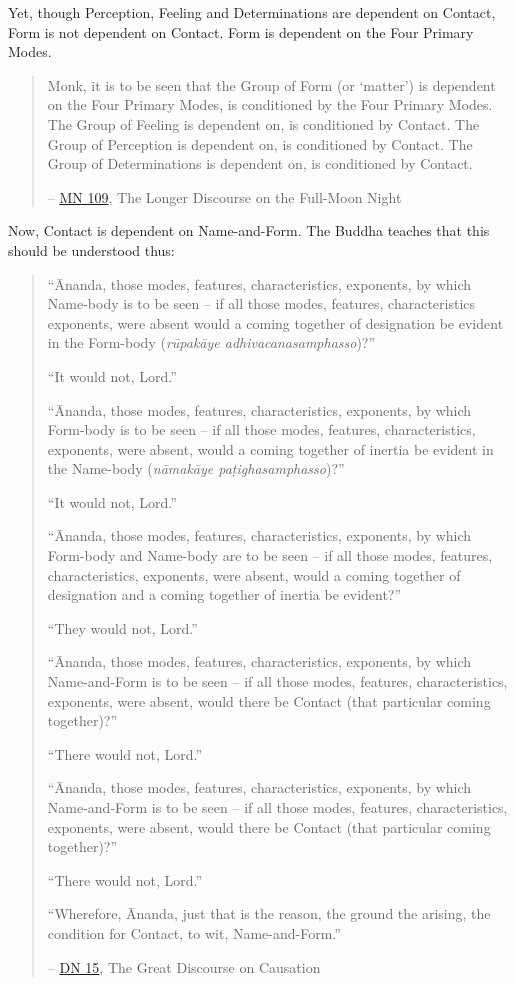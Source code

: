Yet, though Perception, Feeling and Determinations are dependent on Contact, Form is not dependent on Contact. Form is dependent on the Four Primary Modes.

\begin{quote}
\protect\hypertarget{dependent}{}{}Monk, it is to be seen that the Group of Form (or `matter') is dependent on the Four Primary Modes, is conditioned by the Four Primary Modes. The Group of Feeling is dependent on, is conditioned by Contact. The Group of Perception is dependent on, is conditioned by Contact. The Group of Determinations is dependent on, is conditioned by Contact.

 -- \href{https://suttacentral.net/mn109/en/sujato}{MN 109}, The Longer Discourse on the Full-Moon Night
\end{quote}

Now, Contact is dependent on Name-and-Form. The Buddha teaches that this should be understood thus:

\begin{quote}
``Ānanda, those modes, features, characteristics, exponents, by which Name-body is to be seen -- if all those modes, features, characteristics exponents, were absent would a coming together of designation be evident in the Form-body (\emph{rūpakāye adhivacanasamphasso})?''

``It would not, Lord.''

``Ānanda, those modes, features, characteristics, exponents, by which Form-body is to be seen -- if all those modes, features, characteristics, exponents, were absent, would a coming together of inertia be evident in the Name-body (\emph{nāmakāye paṭighasamphasso})?''

``It would not, Lord.''

``Ānanda, those modes, features, characteristics, exponents, by which Form-body and Name-body are to be seen -- if all those modes, features, characteristics, exponents, were absent, would a coming together of designation and a coming together of inertia be evident?''

``They would not, Lord.''

``Ānanda, those modes, features, characteristics, exponents, by which Name-and-Form is to be seen -- if all those modes, features, characteristics, exponents, were absent, would there be Contact (that particular coming together)?''

``There would not, Lord.''

``Ānanda, those modes, features, characteristics, exponents, by which Name-and-Form is to be seen -- if all those modes, features, characteristics, exponents, were absent, would there be Contact (that particular coming together)?''

``There would not, Lord.''

``Wherefore, Ānanda, just that is the reason, the ground the arising, the condition for Contact, to wit, Name-and-Form.''

 -- \href{https://suttacentral.net/dn15/en/bodhi}{DN 15}, The Great Discourse on Causation
\end{quote}

